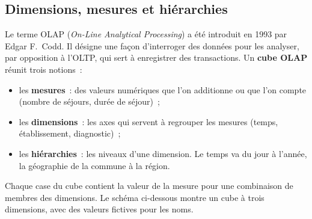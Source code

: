 \subsection{Dimensions, mesures et hiérarchies}

\noindent Le terme OLAP (\textit{On-Line Analytical Processing}) a été introduit en 1993 par Edgar F.~Codd. Il désigne une façon d'interroger des données pour les analyser, par opposition à l'OLTP, qui sert à enregistrer des transactions. Un \textbf{cube OLAP} réunit trois notions~:
\begin{itemize}
	\item les \textbf{mesures}~: des valeurs numériques que l'on additionne ou que l'on compte (nombre de séjours, durée de séjour)~;
	\item les \textbf{dimensions}~: les axes qui servent à regrouper les mesures (temps, établissement, diagnostic)~;
	\item les \textbf{hiérarchies}~: les niveaux d'une dimension. Le temps va du jour à l'année, la géographie de la commune à la région.
\end{itemize}

\noindent Chaque case du cube contient la valeur de la mesure pour une combinaison de membres des dimensions. Le schéma ci-dessous montre un cube à trois dimensions, avec des valeurs fictives pour les noms.

